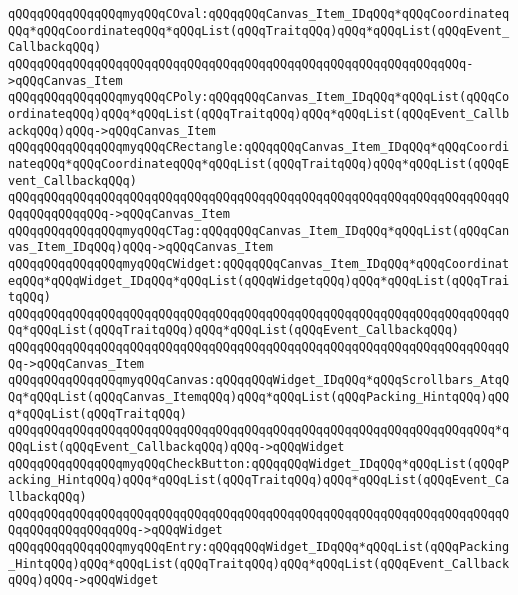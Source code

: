 \verb|qQQqqQQqqQQqqQQqmyqQQqCOval:qQQqqQQqCanvas_Item_IDqQQq*qQQqCoordinateqQQq*qQQqCoordinateqQQq*qQQqList(qQQqTraitqQQq)qQQq*qQQqList(qQQqEvent_CallbackqQQq)|\newline
\verb|qQQqqQQqqQQqqQQqqQQqqQQqqQQqqQQqqQQqqQQqqQQqqQQqqQQqqQQqqQQqqQQq->qQQqCanvas_Item|\newline
\verb|qQQqqQQqqQQqqQQqmyqQQqCPoly:qQQqqQQqCanvas_Item_IDqQQq*qQQqList(qQQqCoordinateqQQq)qQQq*qQQqList(qQQqTraitqQQq)qQQq*qQQqList(qQQqEvent_CallbackqQQq)qQQq->qQQqCanvas_Item|\newline
\verb|qQQqqQQqqQQqqQQqmyqQQqCRectangle:qQQqqQQqCanvas_Item_IDqQQq*qQQqCoordinateqQQq*qQQqCoordinateqQQq*qQQqList(qQQqTraitqQQq)qQQq*qQQqList(qQQqEvent_CallbackqQQq)|\newline
\verb|qQQqqQQqqQQqqQQqqQQqqQQqqQQqqQQqqQQqqQQqqQQqqQQqqQQqqQQqqQQqqQQqqQQqqQQqqQQqqQQqqQQq->qQQqCanvas_Item|\newline
\verb|qQQqqQQqqQQqqQQqmyqQQqCTag:qQQqqQQqCanvas_Item_IDqQQq*qQQqList(qQQqCanvas_Item_IDqQQq)qQQq->qQQqCanvas_Item|\newline
\verb|qQQqqQQqqQQqqQQqmyqQQqCWidget:qQQqqQQqCanvas_Item_IDqQQq*qQQqCoordinateqQQq*qQQqWidget_IDqQQq*qQQqList(qQQqWidgetqQQq)qQQq*qQQqList(qQQqTraitqQQq)|\newline
\verb|qQQqqQQqqQQqqQQqqQQqqQQqqQQqqQQqqQQqqQQqqQQqqQQqqQQqqQQqqQQqqQQqqQQqqQQq*qQQqList(qQQqTraitqQQq)qQQq*qQQqList(qQQqEvent_CallbackqQQq)|\newline
\verb|qQQqqQQqqQQqqQQqqQQqqQQqqQQqqQQqqQQqqQQqqQQqqQQqqQQqqQQqqQQqqQQqqQQqqQQq->qQQqCanvas_Item|\newline
\verb|qQQqqQQqqQQqqQQqmyqQQqCanvas:qQQqqQQqWidget_IDqQQq*qQQqScrollbars_AtqQQq*qQQqList(qQQqCanvas_ItemqQQq)qQQq*qQQqList(qQQqPacking_HintqQQq)qQQq*qQQqList(qQQqTraitqQQq)|\newline
\verb|qQQqqQQqqQQqqQQqqQQqqQQqqQQqqQQqqQQqqQQqqQQqqQQqqQQqqQQqqQQqqQQqqQQq*qQQqList(qQQqEvent_CallbackqQQq)qQQq->qQQqWidget|\newline
\verb|qQQqqQQqqQQqqQQqmyqQQqCheckButton:qQQqqQQqWidget_IDqQQq*qQQqList(qQQqPacking_HintqQQq)qQQq*qQQqList(qQQqTraitqQQq)qQQq*qQQqList(qQQqEvent_CallbackqQQq)|\newline
\verb|qQQqqQQqqQQqqQQqqQQqqQQqqQQqqQQqqQQqqQQqqQQqqQQqqQQqqQQqqQQqqQQqqQQqqQQqqQQqqQQqqQQqqQQq->qQQqWidget|\newline
\verb|qQQqqQQqqQQqqQQqmyqQQqEntry:qQQqqQQqWidget_IDqQQq*qQQqList(qQQqPacking_HintqQQq)qQQq*qQQqList(qQQqTraitqQQq)qQQq*qQQqList(qQQqEvent_CallbackqQQq)qQQq->qQQqWidget|\newline
